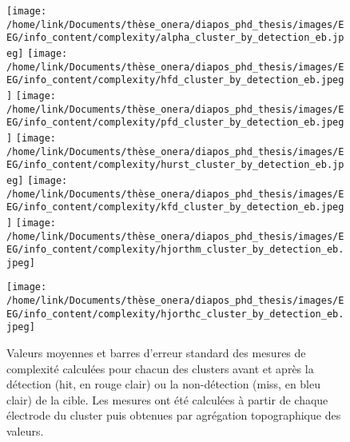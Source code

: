 \begin{figure*}[!t]
\begin{multicols}{2}
\texttt{[image: /home/link/Documents/thèse\_onera/diapos\_phd\_thesis/images/EEG/info\_content/complexity/alpha\_cluster\_by\_detection\_eb.jpeg]}
\texttt{[image: /home/link/Documents/thèse\_onera/diapos\_phd\_thesis/images/EEG/info\_content/complexity/hfd\_cluster\_by\_detection\_eb.jpeg]}
\texttt{[image: /home/link/Documents/thèse\_onera/diapos\_phd\_thesis/images/EEG/info\_content/complexity/pfd\_cluster\_by\_detection\_eb.jpeg]}
\texttt{[image: /home/link/Documents/thèse\_onera/diapos\_phd\_thesis/images/EEG/info\_content/complexity/hurst\_cluster\_by\_detection\_eb.jpeg]}
\texttt{[image: /home/link/Documents/thèse\_onera/diapos\_phd\_thesis/images/EEG/info\_content/complexity/kfd\_cluster\_by\_detection\_eb.jpeg]}
\texttt{[image: /home/link/Documents/thèse\_onera/diapos\_phd\_thesis/images/EEG/info\_content/complexity/hjorthm\_cluster\_by\_detection\_eb.jpeg]}
\end{multicols}
\centering \texttt{[image: /home/link/Documents/thèse\_onera/diapos\_phd\_thesis/images/EEG/info\_content/complexity/hjorthc\_cluster\_by\_detection\_eb.jpeg]}
\caption[Valeurs des mesures de complexité sur chaque cluster avant et après le report/non-report]{Valeurs moyennes et barres d'erreur standard des mesures de complexité calculées pour chacun des clusters avant et après la détection (hit, en rouge clair) ou la non-détection (miss, en bleu clair) de la cible. Les mesures ont été calculées à partir de chaque électrode du cluster puis obtenues par agrégation topographique des valeurs.}
\label{fig:figure5valeursmesurescomplexite}
\end{figure*}

